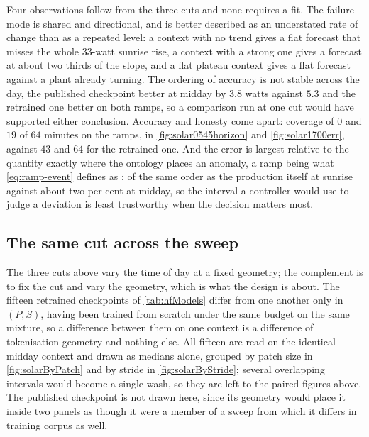 Four observations follow from the three cuts and none requires a fit. The failure mode is shared and directional, and is better described as an understated rate of change than as a repeated level: a context with no trend gives a flat forecast that misses the whole $33$-watt sunrise rise, a context with a strong one gives a forecast at about two thirds of the slope, and a flat plateau context gives a flat forecast against a plant already turning. The ordering of accuracy is not stable across the day, the published checkpoint better at midday by $3.8$ watts against $5.3$ and the retrained one better on both ramps, so a comparison run at one cut would have supported either conclusion. Accuracy and honesty come apart: coverage of $0$ and $19$ of $64$ minutes on the ramps, in \autoref{fig:solar0545horizon} and \autoref{fig:solar1700err}, against $43$ and $64$ for the retrained one. And the error is largest relative to the quantity exactly where the ontology places an anomaly, a ramp being what \autoref{eq:ramp-event} defines as : of the same order as the production itself at sunrise against about two per cent at midday, so the interval a controller would use to judge a deviation is least trustworthy when the decision matters most.

\subsection{The same cut across the sweep}

The three cuts above vary the time of day at a fixed geometry; the complement is to fix the cut and vary the geometry, which is what the design is about. The fifteen retrained checkpoints of \autoref{tab:hfModels} differ from one another only in $(P,S)$, having been trained from scratch under the same budget on the same mixture, so a difference between them on one context is a difference of tokenisation geometry and nothing else. All fifteen are read on the identical midday context and drawn as medians alone, grouped by patch size in \autoref{fig:solarByPatch} and by stride in \autoref{fig:solarByStride}; several overlapping intervals would become a single wash, so they are left to the paired figures above. The published checkpoint is not drawn here, since its geometry would place it inside two panels as though it were a member of a sweep from which it differs in training corpus as well.


